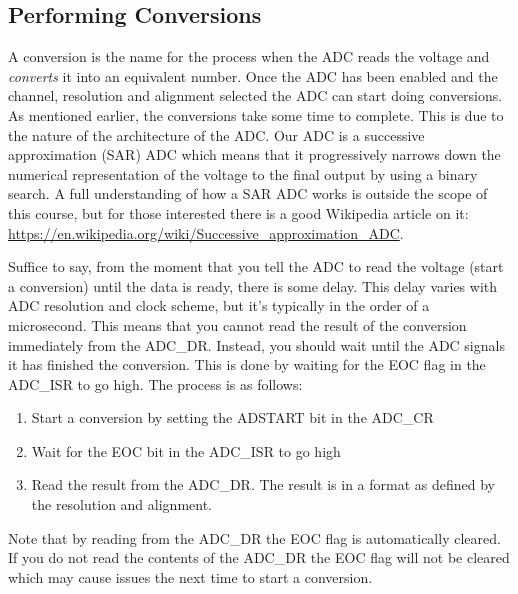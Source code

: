 \subsection{Performing Conversions}
A conversion is the name for the process when the ADC reads the voltage and \emph{converts} it into an equivalent number.
Once the ADC has been enabled and the channel, resolution and alignment selected the ADC can start doing conversions. As mentioned earlier, the conversions take some time to complete. This is due to the nature of the architecture of the ADC. Our ADC is a successive approximation (SAR) ADC which means that it progressively narrows down the numerical representation of the voltage to the final output by using a binary search. A full understanding of how a SAR ADC works is outside the scope of this course, but for those interested there is a good Wikipedia article on it: \url{https://en.wikipedia.org/wiki/Successive_approximation_ADC}. 

Suffice to say, from the moment that you tell the ADC to read the voltage (start a conversion) until the data is ready, there is some delay. This delay varies with ADC resolution and clock scheme, but it's typically in the order of a microsecond. This means that you cannot read the result of the conversion immediately from the ADC\_DR. Instead, you should wait until the ADC signals it has finished the conversion. This is done by waiting for the EOC flag in the ADC\_ISR to go high. The process is as follows:
\begin{enumerate}
\item Start a conversion by setting the ADSTART bit in the ADC\_CR
\item Wait for the EOC bit in the ADC\_ISR to go high
\item Read the result from the ADC\_DR. The result is in a format as defined by the resolution and alignment. 
\end{enumerate}
Note that by reading from the ADC\_DR the EOC flag is automatically cleared. If you do not read the contents of the ADC\_DR the EOC flag will not be cleared which may cause issues the next time to start a conversion. 



